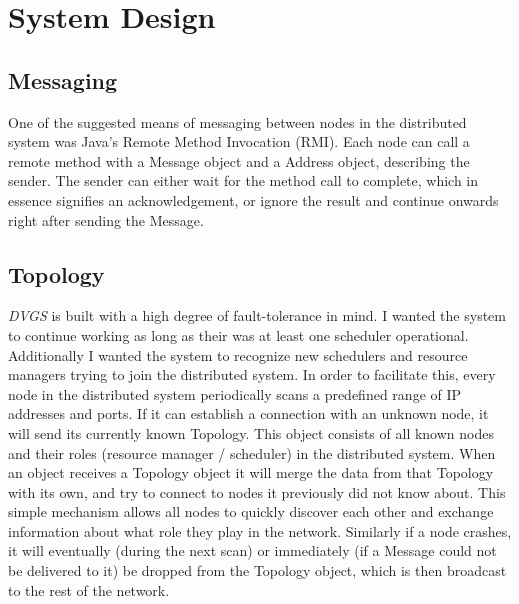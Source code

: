\documentclass{article}
\begin{document}
\section{System Design}

\subsection{Messaging}

One of the suggested means of messaging between nodes in the distributed system was Java's Remote Method Invocation (RMI). Each node can call a remote method with a Message object and a Address object, describing the sender. The sender can either wait for the method call to complete, which in essence signifies an acknowledgement, or ignore the result and continue onwards right after sending the Message. 

\subsection{Topology}

\textit{DVGS} is built with a high degree of fault-tolerance in mind. I wanted the system to continue working as long as their was at least one scheduler operational. Additionally I wanted the system to recognize new schedulers and resource managers trying to join the distributed system. In order to facilitate this, every node in the distributed system periodically scans a predefined range of IP addresses and ports. If it can establish a connection with an unknown node, it will send its currently known Topology. This object consists of all known nodes and their roles (resource manager / scheduler) in the distributed system. When an object receives a Topology object it will merge the data from that Topology with its own, and try to connect to nodes it previously did not know about. This simple mechanism allows all nodes to quickly discover each other and exchange information about what role they play in the network. Similarly if a node crashes, it will eventually (during the next scan) or immediately (if a Message could not be delivered to it) be dropped from the Topology object, which is then broadcast to the rest of the network.
\end{document}
